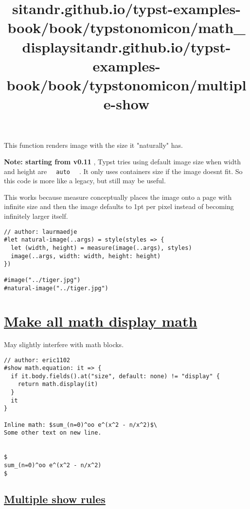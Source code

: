 This function renders image with the size it "naturally" has.

\textbf{Note: starting from v0.11} , Typst tries using default image
size when width and height are \texttt{\ }{\texttt{\ auto\ }}\texttt{\ }
. It only uses container\textquotesingle s size if the image
doesn\textquotesingle t fit. So this code is more like a legacy, but
still may be useful.

This works because measure conceptually places the image onto a page
with infinite size and then the image defaults to 1pt per pixel instead
of becoming infinitely larger itself.

\begin{verbatim}
// author: laurmaedje
#let natural-image(..args) = style(styles => {
  let (width, height) = measure(image(..args), styles)
  image(..args, width: width, height: height)
})

#image("../tiger.jpg")
#natural-image("../tiger.jpg")
\end{verbatim}

\pandocbounded{}


\title{sitandr.github.io/typst-examples-book/book/typstonomicon/math_display}

\section{\texorpdfstring{\hyperref[make-all-math-display-math]{Make all
math display
math}}{Make all math display math}}\label{make-all-math-display-math}

May slightly interfere with math blocks.

\begin{verbatim}
// author: eric1102
#show math.equation: it => {
  if it.body.fields().at("size", default: none) != "display" {
    return math.display(it)
  }
  it
}

Inline math: $sum_(n=0)^oo e^(x^2 - n/x^2)$\
Some other text on new line.


$
sum_(n=0)^oo e^(x^2 - n/x^2)
$
\end{verbatim}

\pandocbounded{}


\title{sitandr.github.io/typst-examples-book/book/typstonomicon/multiple-show}

\subsection{\texorpdfstring{\hyperref[multiple-show-rules]{Multiple show
rules}}{Multiple show rules}}\label{multiple-show-rules}

